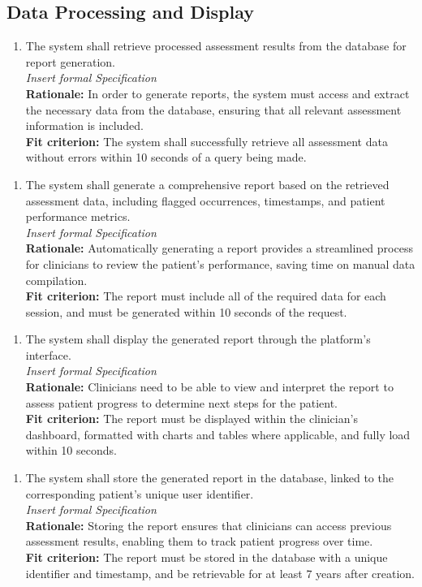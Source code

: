 \documentclass[12pt]{article}
\begin{document}
\subsection{Data Processing and Display}
\begin{enumerate}[{FR-DPD}1. ]
  \item The system shall retrieve processed assessment results from the database for report generation.\\
  \textit{Insert formal Specification}\\
  \textbf{Rationale: }In order to generate reports, the system must access and extract the necessary data from the database, ensuring that all relevant assessment information is included.\\
  \textbf{Fit criterion: }The system shall successfully retrieve all assessment data without errors within 10 seconds of a query being made.
\end{enumerate}
\begin{enumerate}[{FR-DPD}2. ]
  \item The system shall generate a comprehensive report based on the retrieved assessment data, including flagged occurrences, timestamps, and patient performance metrics.\\
  \textit{Insert formal Specification}\\
  \textbf{Rationale: }Automatically generating a report provides a streamlined process for clinicians to review the patient’s performance, saving time on manual data compilation.\\
  \textbf{Fit criterion: }The report must include all of the required data for each session, and must be generated within 10 seconds of the request.
\end{enumerate}
\begin{enumerate}[{FR-DPD}3. ]
  \item The system shall display the generated report through the platform’s interface.\\
  \textit{Insert formal Specification}\\
  \textbf{Rationale: }Clinicians need to be able to view and interpret the report to assess patient progress to determine next steps for the patient.\\
  \textbf{Fit criterion: }The report must be displayed within the clinician's dashboard, formatted with charts and tables where applicable, and fully load within 10 seconds.
\end{enumerate}
\begin{enumerate}[{FR-DPD}4. ]
  \item The system shall store the generated report in the database, linked to the corresponding patient’s unique user identifier.\\
  \textit{Insert formal Specification}\\
  \textbf{Rationale: }Storing the report ensures that clinicians can access previous assessment results, enabling them to track patient progress over time.\\
  \textbf{Fit criterion: }The report must be stored in the database with a unique identifier and timestamp, and be retrievable for at least 7 years after creation.
\end{enumerate}
\end{document}
